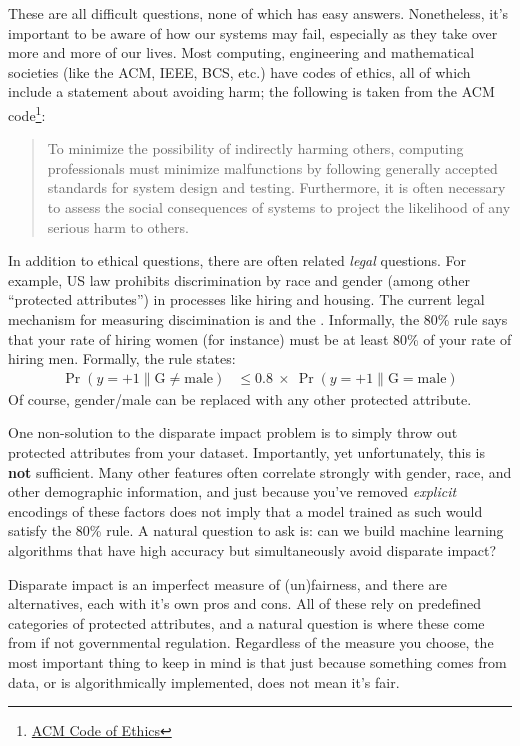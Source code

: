 These are all difficult questions, none of which has easy answers.
Nonetheless, it's important to be aware of how our systems may fail, especially as they take over more and more of our lives.
Most computing, engineering and mathematical societies (like the ACM, IEEE, BCS, etc.) have codes of ethics, all of which include a statement about avoiding harm; the following is taken from the ACM code\footnote{\href{https://www.acm.org/about-acm/acm-code-of-ethics-and-professional-conduct}{ACM Code of Ethics}}:
\begin{quote}
  To minimize the possibility of indirectly harming others, computing professionals must minimize malfunctions by following generally accepted standards for system design and testing. Furthermore, it is often necessary to assess the social consequences of systems to project the likelihood of any serious harm to others.
\end{quote}

In addition to ethical questions, there are often related \emph{legal} questions.
For example, US law prohibits discrimination by race and gender (among other ``protected attributes'') in processes like hiring and housing.
The current legal mechanism for measuring discimination is  and the .
Informally, the 80\% rule says that your rate of hiring women (for instance) must be at least 80\% of your rate of hiring men.
Formally, the rule states:
\begin{align}
                    \Pr(y = +1 \| \text{G} \neq \text{male}) 
& \leq 0.8 ~\times~ \Pr(y = +1 \| \text{G} =    \text{male}) 
\end{align}
Of course, gender/male can be replaced with any other protected attribute.

One non-solution to the disparate impact problem is to simply throw out protected attributes from your dataset.
Importantly, yet unfortunately, this is \textbf{not} sufficient.
Many other features often correlate strongly with gender, race, and other demographic information, and just because you've removed \emph{explicit} encodings of these factors does not imply that a model trained as such would satisfy the 80\% rule.
A natural question to ask is: can we build machine learning algorithms that have high accuracy but simultaneously avoid disparate impact?

Disparate impact is an imperfect measure of (un)fairness, and there are alternatives, each with it's own pros and cons.
All of these rely on predefined categories of protected attributes, and a natural question is where these come from if not governmental regulation.
Regardless of the measure you choose, the most important thing to keep in mind is that just because something comes from data, or is algorithmically implemented, does not mean it's fair.


